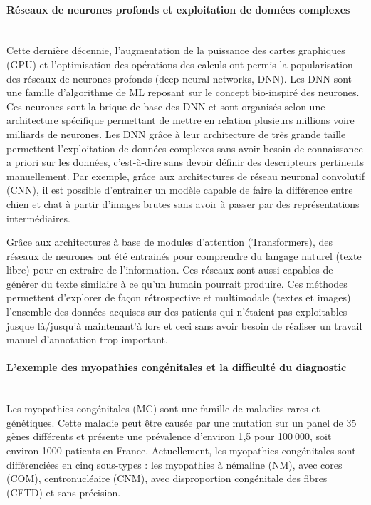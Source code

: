\paragraph{\textbf{Réseaux de neurones profonds et exploitation de données complexes}}\mbox{}\\

Cette dernière décennie, l’augmentation de la puissance des cartes graphiques (GPU) et l’optimisation des opérations des calculs ont permis la popularisation des réseaux de neurones profonds (deep neural networks, DNN). Les DNN sont une famille d’algorithme de ML reposant sur le concept bio-inspiré des neurones. Ces neurones sont la brique de base des DNN et sont organisés selon une architecture spécifique permettant de mettre en relation plusieurs millions voire milliards de neurones. Les DNN grâce à leur architecture de très grande taille permettent l’exploitation de données complexes sans avoir besoin de connaissance a priori sur les données, c’est-à-dire sans devoir définir des descripteurs pertinents manuellement.
Par exemple, grâce aux architectures de réseau neuronal convolutif (CNN), il est possible d’entrainer un modèle capable de faire la différence entre chien et chat à partir d’images brutes sans avoir à passer par des représentations intermédiaires. 

Grâce aux architectures à base de modules d’attention (Transformers), des réseaux de neurones ont été entrainés pour comprendre du langage naturel (texte libre) pour en extraire de l’information. Ces réseaux sont aussi capables de générer du texte similaire à ce qu’un humain pourrait produire.
Ces méthodes permettent d’explorer de façon rétrospective et multimodale (textes et images) l’ensemble des données acquises sur des patients qui n’étaient pas exploitables jusque là/jusqu’à maintenant’à lors et ceci sans avoir besoin de réaliser un travail manuel d’annotation trop important.

\paragraph{\textbf{L’exemple des myopathies congénitales et la difficulté du diagnostic}}\mbox{}\\

Les myopathies congénitales (MC) sont une famille de maladies rares et génétiques. Cette maladie peut être causée par une mutation sur un panel de 35 gènes différents et présente une prévalence d’environ 1,5 pour 100 000, soit environ 1000 patients en France. Actuellement, les myopathies congénitales sont différenciées en cinq sous-types : les myopathies à némaline (NM), avec cores (COM), centronucléaire (CNM), avec disproportion congénitale des fibres (CFTD) et sans précision.

